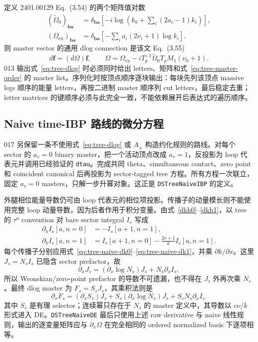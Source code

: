 ﻿\documentclass[a4paper,11pt]{article}
\begin{document}
定义 2401.00129 Eq.~(3.54) 的两个矩阵值对数
\begin{align}
 (\widetilde\Omega_0)_{\bm b\bm a}
 &=\delta_{\bm b\bm a}\left[-i\log\left(k_0+\sum_i(2a_i-1)k_i\right)\right],\\
 (\Omega_{\mathrm{ex}})_{\bm b\bm a}
 &=\delta_{\bm b\bm a}\left[-\sum_i a_i(2\nu_i+1)\log k_i\right].
\end{align}
则 master vector 的通用 dlog connection 是该文 Eq.~(3.55)
\begin{equation}
 d\bm f=(d\Omega)\bm f,
 \qquad
 \Omega=\Omega_{\mathrm{ex}}
 -iT_p^{-1}\widetilde\Omega_0T_pM_1(\nu_0+1).
 \label{eq:tree-dlog}
\end{equation}
013 输出式~\eqref{eq:tree-dlog} 时必须同时给出 letters、矩阵和式~\eqref{eq:tree-master-order} 的 master list。序列化时按顶点顺序逐块输出：每块先列该顶点 massive legs 顺序的能量 letters，再按二进制 master 顺序列 cut letters，最后稳定去重；letter matrices 的键顺序必须与此完全一致，不能依赖展开后表达式的遍历顺序。

\subsection{Naive time-IBP 路线的微分方程}

017 另保留一条不使用式~\eqref{eq:tree-dlog} 或 $A_\pm$ 构造约化规则的路线。对每个 sector 的 $a_v=0$ binary master，把一个活动顶点改成 $a_v=1$，反投影为 loop 代表元并调用已经验证的 \texttt{dtau}。完成共同 theta、simultaneous contact、zero point 和 coincident canonical 后再投影为 sector-tagged tree 方程。所有方程一次联立，固定 $a_v=0$ masters，只解一步升幂对象。这正是 \texttt{DSTreeNaiveIBP} 的定义。

外腿相位能量导数仍可由 loop 代表元的相位项投影。传播子的动量模长则不能使用完整 loop 动量导数，因为后者作用于积分变量。由式~\eqref{dkh0}--\eqref{dkh1}，以 tree 的 $\tau^a$ convention 对 bare sector integral $I_s$ 写成
\begin{align}
 \partial_k I_s[a,n=0]&=-I_s[a+1,n=1],\label{eq:tree-naive-dk0}\\
 \partial_k I_s[a,n=1]&=I_s[a+1,n=0]-\frac{2\nu+1}{k}I_s[a,n=1].\label{eq:tree-naive-dk1}
\end{align}
每个传播子分别应用式~\eqref{eq:tree-naive-dk0}--\eqref{eq:tree-naive-dk1}，并乘 $\partial k/\partial x$。这里 $J_s=N_sI_s$ 已隐含 sector prefactor，故
\begin{equation}
 \partial_xJ_s=(\partial_x\log N_s)J_s+N_s\partial_xI_s,
\end{equation}
所以 Wronskian/zero-point prefactor 的导数不可遗漏，也不得在 $J_s$ 外再次乘 $N_s$。最终 dlog master 为 $F_s=S_sJ_s$，其乘积法则是
\begin{equation}
 \partial_xF_s=(\partial_xS_s)J_s+S_s(\partial_x\log N_s)J_s+S_sN_s\partial_xI_s.
\end{equation}
其中 $S_s$ 是有理 selector；连续幂只存在于 $N_s$ 的 master 定义中，其导数以 $c\nu/k$ 形式进入 DE。\texttt{DSTreeNaiveDE} 最后只使用上述 raw derivative 与 naive 线性规则，输出的逐变量矩阵应与 $\partial_x\Omega$ 在完全相同的 ordered normalized basis 下逐项相等。
\end{document}
